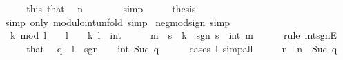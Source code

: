\begin{isabellebody}
\ \ \isamarkupfalse%
\ \isamarkupfalse%
\ this\ that\ \isamarkupfalse%
\ {\isachardoublequoteopen}n\ {\isachargreater}{\kern0pt}\ {}{\isachardoublequoteclose}\isanewline
\ \ \ \ \isamarkupfalse%
\ simp\isanewline
\ \ \isamarkupfalse%
\ \isamarkupfalse%
\ {\isacharquery}{\kern0pt}thesis\isanewline
\ \ \ \ \isamarkupfalse%
\ {\isacharparenleft}{\kern0pt}simp\ only{\isacharcolon}{\kern0pt}\ modulo{\isacharunderscore}{\kern0pt}int{\isacharunderscore}{\kern0pt}unfold{\isacharparenright}{\kern0pt}\ simp\isanewline
{}\isamarkupfalse%
%
\endisatagproof
{\isafoldproof}%
%
\isadelimproof
\isanewline
%
\endisadelimproof
\isanewline
{}\isamarkupfalse%
\ neg{\isacharunderscore}{\kern0pt}mod{\isacharunderscore}{\kern0pt}sign\ {\isacharbrackleft}{\kern0pt}simp{\isacharbrackright}{\kern0pt}{\isacharcolon}{\kern0pt}\isanewline
\ \ {\isachardoublequoteopen}k\ mod\ l\ {\isasymle}\ {}{\isachardoublequoteclose}\ \ {\isachardoublequoteopen}l\ {\isacharless}{\kern0pt}\ {}{\isachardoublequoteclose}\ \ k\ l\ {\isacharcolon}{\kern0pt}{\isacharcolon}{\kern0pt}\ int\isanewline
%
\isadelimproof
%
\endisadelimproof
%
\isatagproof
{}\isamarkupfalse%
\ {\isacharminus}{\kern0pt}\isanewline
\ \ \isamarkupfalse%
\ m\ \ s\ \ {\isachardoublequoteopen}k\ {\isacharequal}{\kern0pt}\ sgn\ s\ {\isacharasterisk}{\kern0pt}\ int\ m{\isachardoublequoteclose}\isanewline
\ \ \ \ \isamarkupfalse%
\ {\isacharparenleft}{\kern0pt}rule\ int{\isacharunderscore}{\kern0pt}sgnE{\isacharparenright}{\kern0pt}\isanewline
\ \ \isamarkupfalse%
\ \isamarkupfalse%
\ that\ \isamarkupfalse%
\ q\ \ {\isachardoublequoteopen}l\ {\isacharequal}{\kern0pt}\ sgn\ {\isacharparenleft}{\kern0pt}{\isacharminus}{\kern0pt}\ {}{\isacharparenright}{\kern0pt}\ {\isacharasterisk}{\kern0pt}\ int\ {\isacharparenleft}{\kern0pt}Suc\ q{\isacharparenright}{\kern0pt}{\isachardoublequoteclose}\isanewline
\ \ \ \ \isamarkupfalse%
\ {\isacharparenleft}{\kern0pt}cases\ l{\isacharparenright}{\kern0pt}\ simp{\isacharunderscore}{\kern0pt}all\isanewline
\ \ \isamarkupfalse%
\ \isamarkupfalse%
\ n\ \ {\isachardoublequoteopen}n\ {\isacharequal}{\kern0pt}\ Suc\ q{\isachardoublequoteclose}\isanewline

\end{isabellebody}
